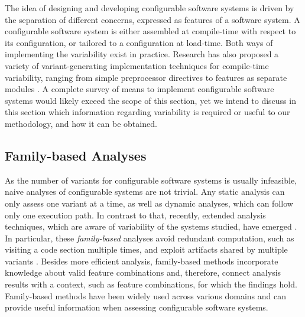 The idea of designing and developing configurable software systems is driven by
the separation of different concerns, expressed as features of a software
system. A configurable software system is either assembled at compile-time with
respect to its configuration, or tailored to a configuration at
load-time. Both ways of implementing the variability exist in practice. Research
has also proposed a variety of variant-generating implementation techniques for
compile-time variability, ranging from simple preprocessor directives to
features as separate modules \citep{kastner_model_2009}.  A complete survey of means to implement
configurable software systems would likely exceed the scope of this section, yet we intend to discuss in this
section which information regarding variability is required or useful to our
methodology, and how it can be obtained.

\subsection{Family-based Analyses}
As the number of variants for configurable software systems is usually
infeasible, naive analyses of configurable systems are not trivial. Any static
analysis can only assess one variant at a time, as well as dynamic analyses,
which can follow only one execution path. 
In contrast to that, recently,
extended analysis techniques, which are aware of variability of the systems
studied, have emerged \citep{thum_classification_2014}. In particular, these
\emph{family-based} analyses avoid redundant computation, such as visiting a
code section multiple times, and exploit artifacts shared by multiple variants
\citep{thum_classification_2014}. Besides more efficient analysis, family-based
methods incorporate knowledge about valid feature combinations
\citep{thum_classification_2014} and, therefore, connect analysis results with
a context, such as feature combinations, for which the findings hold.
Family-based methods have been widely used across various domains and can
provide useful information when assessing configurable software systems.

